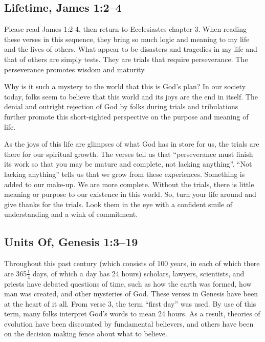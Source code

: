 \documentclass[12pt]{memoir}
\begin{document}
\subsection[Lifetime]{Lifetime, James 1:2--4}

Please read James 1:2-4, then return to Ecclesiastes chapter 3. When reading these verses in this sequence, they bring so much logic and
meaning to my life and the lives of others. What appear to be disasters and tragedies in my life and that of others are simply tests. They
are trials that require perseverance. The perseverance promotes wisdom
and maturity. 

Why is it such a mystery to the world that this is God's plan? In
our society today, folks seem to believe that this world and its joys are the end in itself. The denial and outright rejection of God by folks during trials and tribulations further promote this short-sighted
perspective on the purpose and meaning of life.

As the joys of this life are glimpses of what God has in store for
us, the trials are there for our spiritual growth. The verses tell
us that ``perseverance must finish its work so that you may be mature
and complete, not lacking anything''. ``Not lacking anything''
tells us that we grow from these experiences. Something is added to
our make-up. We are more complete. Without the trials, there is little
meaning or purpose to our existence in this world. So, turn your life around and give thanks for the trials. Look them in the eye with a confident smile of understanding and a wink of commitment.

\subsection[Units Of]{Units Of, Genesis 1:3--19}

Throughout this past century (which consists of 100 years, in each of which there are 365$\frac{1}{4}$ days, of which a day has 24 hours) scholars, lawyers, scientists, and priests have debated questions of time, such as how the earth was formed, how man was created, and other mysteries of God. These verses in Genesis have been at the heart of it all. From verse 3, the term ``first day'' was used. By use of this term, many folks interpret God's words to mean 24 hours. As a result, theories of evolution have been discounted by fundamental believers, and others have been on the decision making fence about what to believe.
\end{document}
